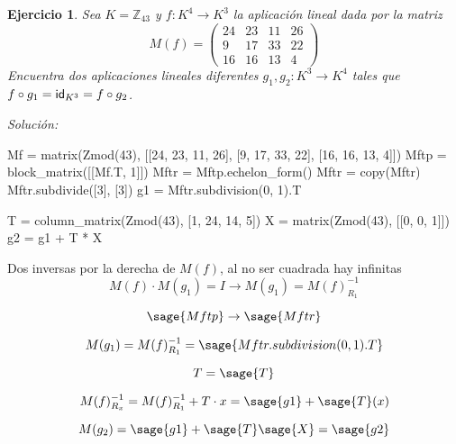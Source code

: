 \documentclass{amsart}
\newtheorem{ejer}{Ejercicio}
\begin{document}

\pagebreak

\begin{ejer}
Sea $K = {\mathbb Z}_{43}$ y $f:K^4 \to K^3$ la aplicación lineal
dada por la matriz $$M(f) = \left(\begin{array}{rrrr}
24 & 23 & 11 & 26 \\
9 & 17 & 33 & 22 \\
16 & 16 & 13 & 4
\end{array}\right)$$
Encuentra dos aplicaciones lineales diferentes $g_1,g_2:K^3 \to K^4$ 
tales que $f\circ g_1 = {\sf id}_{K^3} = f\circ g_2$.
\end{ejer}

{\it Solución: }


\begin{sageblock}
	Mf = matrix(Zmod(43), [[24, 23, 11, 26], [9, 17, 33, 22], [16, 16, 13, 4]])
	Mftp = block_matrix([[Mf.T, 1]])
	Mftr = Mftp.echelon_form()
	Mftr = copy(Mftr)
	Mftr.subdivide([3], [3])
	g1 = Mftr.subdivision(0, 1).T
	
	T = column_matrix(Zmod(43), [1, 24, 14, 5])
	X = matrix(Zmod(43), [[0, 0, 1]])
	g2 = g1 + T * X
\end{sageblock}

Dos inversas por la derecha de $M(f)$, al no ser cuadrada hay infinitas
$$
	M(f) \cdot M(g_1) = I \to M(g_1) = M(f)^{-1}_{R_1}
$$

$$
	\sage{Mftp} \to \sage{Mftr}
$$

$$
	M(g_1) = M(f)^{-1}_{R_1} = \sage{Mftr.subdivision(0, 1).T}
$$


$$
	T = \sage{T}
$$

$$
	M(f)^{-1}_{R_x} = M(f)^{-1}_{R_1} + T \cdot x = \sage{g1} + \sage{T} (x)
$$

$$
	M(g_2) = \sage{g1} + \sage{T} \sage{X} = \sage{g2}
$$

\end{document}
